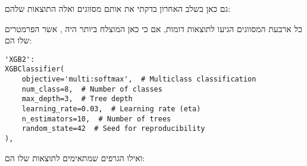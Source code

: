 גם כאן בשלב האחרון בדקתי את אותם מסווגים ואלה התוצאות שלהם:

כל ארבעת המסווגים הגיעו לתוצאות דומות, אם כי כאן המוצלח ביותר היה  , אשר הפרמטרים שלו הם:
\EN
\begin{lstlisting}
'XGB2': 
XGBClassifier(
    objective='multi:softmax',  # Multiclass classification
    num_class=8,  # Number of classes
    max_depth=3,  # Tree depth
    learning_rate=0.03,  # Learning rate (eta)
    n_estimators=10,  # Number of trees
    random_state=42  # Seed for reproducibility
),
\end{lstlisting}
\HE
\newpage
ואילו הגרפים שמתאימים לתוצאות שלו הם:

\clearpage
